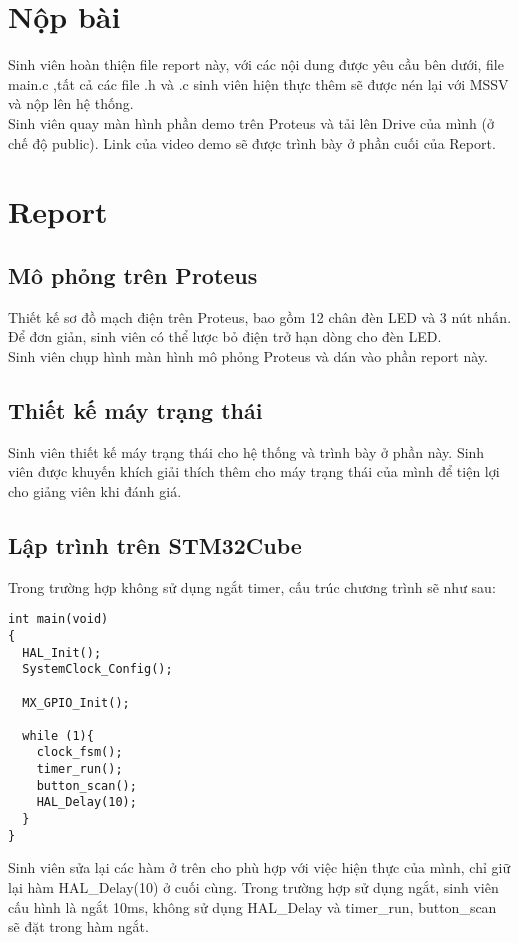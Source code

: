 \section{Nộp bài}
Sinh viên hoàn thiện file report này, với các nội dung được yêu cầu bên dưới, file main.c
,tất cả các file .h và .c sinh viên hiện thực thêm sẽ được nén lại với MSSV và nộp lên hệ thống. \\

Sinh viên quay màn hình phần demo trên Proteus và tải lên Drive của mình (ở chế độ public). Link của video demo sẽ được trình bày ở phần cuối của Report.


\section{Report}
\subsection{Mô phỏng trên Proteus}
Thiết kế sơ đồ mạch điện trên Proteus, bao gồm 12 chân đèn LED và 3 nút nhấn. Để đơn giản, sinh viên có thể lược bỏ điện trở hạn dòng cho đèn LED.\\

Sinh viên chụp hình màn hình mô phỏng Proteus và dán vào phần report này.

\subsection{Thiết kế máy trạng thái}
Sinh viên thiết kế máy trạng thái cho hệ thống và trình bày ở phần này. Sinh viên được khuyến khích giải thích thêm cho máy trạng thái của mình để tiện lợi cho giảng viên khi đánh giá.

\subsection{Lập trình trên STM32Cube}
Trong trường hợp không sử dụng ngắt timer, cấu trúc chương trình sẽ như sau:

\begin{lstlisting}[caption=Cấu trúc chương trình trên main]
int main(void)
{
  HAL_Init();
  SystemClock_Config();

  MX_GPIO_Init();

  while (1){
    clock_fsm();
    timer_run();
    button_scan();
    HAL_Delay(10);
  }
}
\end{lstlisting}

Sinh viên sửa lại các hàm ở trên cho phù hợp với việc hiện thực của mình, chỉ giữ lại hàm HAL\_Delay(10) ở cuối cùng. Trong trường hợp sử dụng ngắt, sinh viên cấu hình là ngắt 10ms, không sử dụng HAL\_Delay và timer\_run, button\_scan  sẽ đặt trong hàm ngắt.\\

